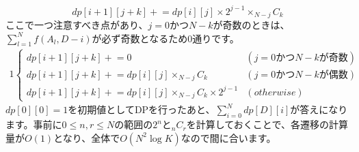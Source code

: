 \documentclass{ujreport}
\begin{document}
$$dp[i + 1][j + k] \mathrel{+}= dp[i][j] \times 2^{j-1} \times _{N-j}C_k$$
ここで一つ注意すべき点があり、$j = 0$かつ$N-k$が奇数のときは、$\sum_{l=1}^{N} f(A_l, D - i)$が必ず奇数となるため0通りです。
\begin{alignat*}{1}
\left\{
\begin{array}{ll}
  dp[i + 1][j + k] \mathrel{+}= 0 &(j = 0かつN - kが奇数)\\
  dp[i + 1][j + k] \mathrel{+}= dp[i][j] \times _{N-j}C_k &(j = 0かつN - kが偶数)\\
  dp[i + 1][j + k] \mathrel{+}= dp[i][j] \times _{N-j}C_k \times 2^{j-1} &(otherwise)
\end{array}
\right.
\end{alignat*}
$dp[0][0] = 1$を初期値としてDPを行ったあと、$\sum_{i = 0}^{N} dp[D][i]$が答えになります。事前に$0 \le n, r \le N$の範囲の$2^n$と$_nC_r$を計算しておくことで、各遷移の計算量が$O(1)$となり、全体で$O(N^2\log K)$なので間に合います。
\end{document}
